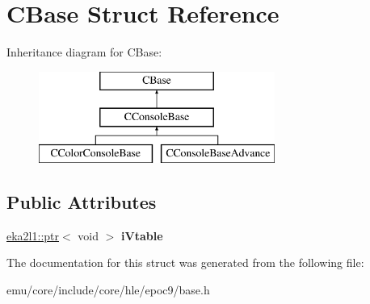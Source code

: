 \hypertarget{struct_c_base}{}\section{C\+Base Struct Reference}
\label{struct_c_base}
Inheritance diagram for C\+Base\+:\begin{figure}[H]
\begin{center}
\leavevmode
\includegraphics[height=3.000000cm]{struct_c_base}
\end{center}
\end{figure}
\subsection*{Public Attributes}
\begin{DoxyCompactItemize}
\item 
\mbox{\label{struct_c_base_ab2d05a26d41aad80ade884a06f45254e}} 
\mbox{\hyperlink{classeka2l1_1_1ptr}{eka2l1\+::ptr}}$<$ void $>$ {\bfseries i\+Vtable}
\end{DoxyCompactItemize}


The documentation for this struct was generated from the following file\+:\begin{DoxyCompactItemize}
\item 
emu/core/include/core/hle/epoc9/base.\+h\end{DoxyCompactItemize}
